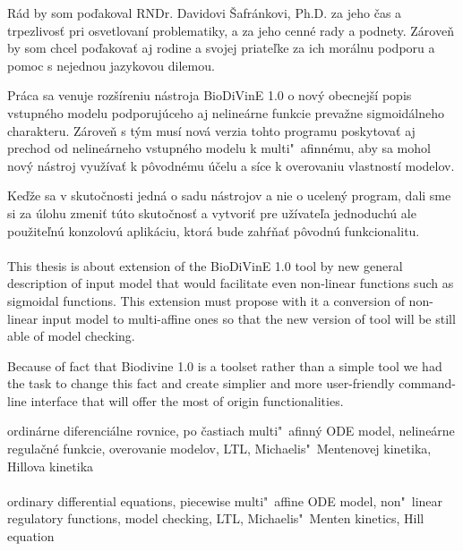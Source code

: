 \documentclass[11pt,final,oneside]{fithesis}
\begin{document}
\FrontMatter
\ThesisTitlePage


\begin{ThesisDeclaration}
\DeclarationText
\AdvisorName
\end{ThesisDeclaration}

\begin{ThesisThanks}
R\'ad by som po\v dakoval RNDr. Davidovi \v Safr\'ankovi, Ph.D. za jeho \v cas a trpezlivos\v t pri osvetlovan\'i problematiky, a za jeho cenn\'e rady a 
podnety.
Z\'arove\v n by som chcel po\v dakova\v t aj rodine a svojej priate\v lke za ich mor\'alnu podporu a pomoc s nejednou jazykovou dilemou.
\end{ThesisThanks}

\begin{ThesisAbstract}
Pr\'aca sa venuje roz\v s\'ireniu n\'astroja BioDiVinE 1.0 o nov\'y obecnej\v s\'i popis vstupn\'eho modelu podporuj\'uceho aj neline\'arne funkcie 
preva\v zne sigmoid\'alneho charakteru. Z\'arove\v n s t\'ym mus\'i nov\'a verzia tohto programu poskytova\v t aj prechod od neline\'arneho vstupn\'eho
modelu k multi"~afinn\'emu, aby sa mohol nov\'y n\'astroj vyu\v z\'iva\v t k p\^ ovodn\'emu \'u\v celu a s\'ice k overovaniu vlastnost\'i modelov.

Ke\v d\v ze sa v skuto\v cnosti jedn\'a o sadu n\'astrojov a nie o ucelen\'y program, dali sme si za \'ulohu zmeni\v t t\'uto skuto\v cnos\v t a vytvori\v t
pre u\v z\'ivate\v la jednoduch\'u ale pou\v zite\v ln\'u konzolov\'u aplik\'aciu, ktor\'a bude zah\'r\v na\v t p\^ ovodn\'u funkcionalitu.\\\\

\noindent
This thesis is about extension of the BioDiVinE 1.0 tool by new general description of input model that would facilitate even non-linear functions such as 
sigmoidal functions. This extension must propose with it a conversion of non-linear input model to multi-affine ones so that the new version of tool will 
be still able of model checking.

Because of fact that Biodivine 1.0 is a toolset rather than a simple tool we had the task to change this fact and create simplier and more user-friendly
command-line interface that will offer the most of origin functionalities.

\end{ThesisAbstract}

\begin{ThesisKeyWords}
ordin\'arne diferenci\'alne rovnice, po \v castiach multi"~afinn\'y ODE model, neline\'arne regula\v cn\'e funkcie, overovanie modelov, LTL, 
Michaelis"~Mentenovej kinetika, Hillova kinetika\\\\

\noindent
ordinary differential equations, piecewise multi"~affine ODE model, non"~linear regulatory functions, model checking, LTL, Michaelis"~Menten kinetics,
Hill equation
\end{ThesisKeyWords}
\end{document}
